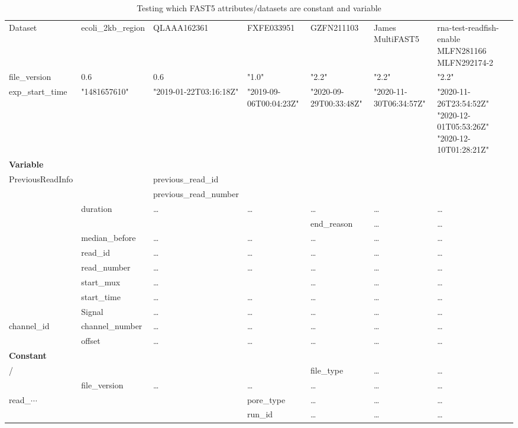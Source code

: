 \documentclass{report}[a4paper]
\begin{document}
\begin{longtable}{|l|*{6}{p{3cm}}|}
    \caption{Testing which FAST5 attributes/datasets are constant and variable} \\
    \hline
    Dataset & ecoli\_2kb\_region & QLAAA162361 & FXFE033951 & GZFN211103 & James MultiFAST5 & rna-test-readfish-enable \vline MLFN281166 \vline MLFN292174-2 \\
    file\_version & 0.6 & 0.6 & "1.0" & "2.2" & "2.2" & "2.2" \\
    exp\_start\_time & "1481657610" & "2019-01-22T03:16:18Z" & "2019-09-06T00:04:23Z" & "2020-09-29T00:33:48Z" & "2020-11-30T06:34:57Z" & "2020-11-26T23:54:52Z" \vline "2020-12-01T05:53:26Z" \vline "2020-12-10T01:28:21Z" \\
    \hline
    \hline
    \textbf{Variable} & & & & & & \\
    \hline
    \hline
    PreviousReadInfo & & previous\_read\_id & & & & \\
    & & previous\_read\_number & & & & \\
    \hline
    [Read\_$\cdots$\vline Raw] & duration & \dots & \dots & \dots & \dots & \dots \\
    & & & & end\_reason & \dots & \dots \\
    & median\_before & \dots & \dots & \dots & \dots & \dots \\
    & read\_id & \dots & \dots & \dots & \dots & \dots \\
    & read\_number & \dots & \dots & \dots & \dots & \dots \\
    & start\_mux & \dots & & \dots & \dots & \dots \\
    & start\_time & \dots & \dots & \dots & \dots & \dots \\
    & Signal & \dots & \dots & \dots & \dots & \dots \\
    \hline
    channel\_id & channel\_number & \dots & \dots & \dots & \dots & \dots \\
    & offset & \dots & \dots & \dots & \dots & \dots \\
    \hline
    \hline
    \textbf{Constant} & & & & & & \\
    \hline
    \hline
    / & & & & file\_type & \dots & \dots \\
    & file\_version & \dots & \dots & \dots & \dots & \dots \\
    \hline
    read\_$\cdots$ & & & pore\_type & \dots & \dots & \dots \\
    & & & run\_id & \dots & \dots & \dots \\

\end{longtable}
\end{document}
